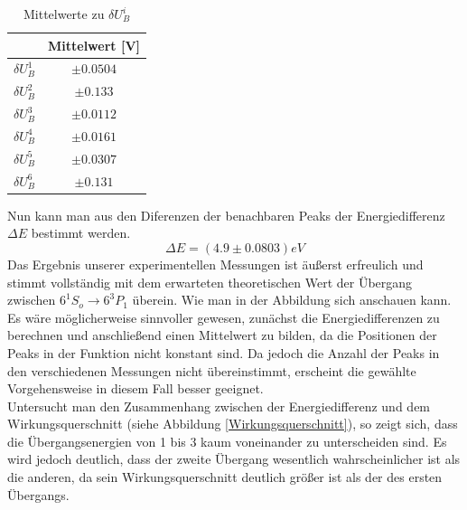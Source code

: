 \documentclass{article}
\begin{document}
\begin{multicols}{2}
\begin{table}[H]
  \centering
  \begin{tabular}{cc} 
      \hline
       & Mittelwert [V] \\ \hline
      $\delta U^1_B$ & $\pm 0.0504$ \\ \hline
      $\delta U^2_B$ & $\pm 0.133$ \\ \hline
      $\delta U^3_B$ & $\pm 0.0112$ \\ \hline
      $\delta U^4_B$ & $\pm 0.0161$ \\ \hline
      $\delta U^5_B$ & $\pm 0.0307$ \\ \hline
      $\delta U^6_B$ & $\pm 0.131$ \\ \hline
  \end{tabular}
  \caption{Mittelwerte zu $\delta U^i_B$}
  \label{tab:mean_values}
\end{table}
Nun kann man aus den Diferenzen der benachbaren Peaks der Energiedifferenz $\Delta E$ bestimmt werden. 
\begin{equation*}
  \Delta E=(4.9 \pm 0.0803)eV
\end{equation*}
Das Ergebnis unserer experimentellen Messungen ist äußerst erfreulich und stimmt vollständig 
mit dem erwarteten theoretischen Wert der Übergang zwischen $6^1 S_o \rightarrow 6^3P_1$ überein. 
Wie man in der Abbildung sich anschauen kann. Es wäre möglicherweise sinnvoller gewesen, zunächst 
die Energiedifferenzen zu berechnen und anschließend einen Mittelwert zu bilden, da die Positionen 
der Peaks in der Funktion nicht konstant sind. Da jedoch die Anzahl der Peaks in den verschiedenen 
Messungen nicht übereinstimmt, erscheint die gewählte Vorgehensweise in diesem Fall besser geeignet.\\

Untersucht man den Zusammenhang zwischen der Energiedifferenz und dem Wirkungsquerschnitt 
(siehe Abbildung \ref{Wirkungsquerschnitt}), so zeigt sich, dass die Übergangsenergien von 
1 bis 3 kaum voneinander zu unterscheiden sind. Es wird jedoch deutlich, dass der zweite Übergang wesentlich wahrscheinlicher ist 
als die anderen, da sein Wirkungsquerschnitt deutlich größer ist als der des ersten Übergangs.


\end{multicols}
\end{document}
